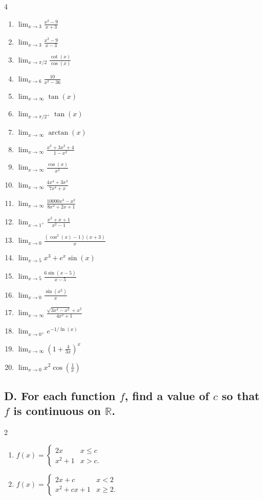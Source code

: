 \documentclass{article}
\begin{document}
\begin{multicols}{4}

\begin{enumerate}
\item $\displaystyle\lim_{x\to 3}\frac{x^2-9}{x+3}$
\item $\displaystyle\lim_{x\to 3}\frac{x^2-9}{x-3}$
\item $\displaystyle\lim_{x\to \pi/2}\frac{\cot(x)}{\cos(x)}$
\item $\displaystyle\lim_{x\to 6}\frac{10}{x^2-36}$
\item $\displaystyle\lim_{x\to \infty}\tan(x)$
\item $\displaystyle\lim_{x\to\pi/2^+} \tan(x)$
\item $\displaystyle\lim_{x\to \infty}\arctan(x)$
\item $\displaystyle\lim_{x\to \infty}\frac{x^3+3x^2+4}{1-x^2}$
\item $\displaystyle\lim_{x\to \infty}\frac{\cos(x)}{x^2}$
\item $\displaystyle\lim_{x\to \infty}\frac{4x^4+3x^3}{7x^4+x}$
\item $\displaystyle\lim_{x\to \infty}\frac{10000x^3-x^2}{8x^4+2x+1}$
\item $\displaystyle\lim_{x \rightarrow 1^+} \frac{x^2+x+1}{x^2-1}$
\item $\displaystyle\lim_{x\to 0}\frac{(\cos^2(x) - 1)(x+3)}{x}$
\item $\displaystyle\lim_{x\to 5}x^3+e^x\sin(x)$
\item $\displaystyle\lim_{x\to 5}\frac{6\sin(x-5)}{x-5}$
\item $\displaystyle\lim_{x\to 0}\frac{\sin(x^2)}{x}$
\item $\displaystyle\lim_{x\to \infty}\frac{\sqrt{3x^4-x^2}+x^2}{4x^2+1}$
\item $\displaystyle\lim_{x\to0^+}e^{-1/\ln\left(x\right)}$
\item $\displaystyle\lim_{x\to\infty}\left(1+\frac{4}{3x}\right)^x$
\item $\displaystyle\lim_{x\to0}x^{2}\cos\left(\frac{1}{x}\right)$
\end{enumerate}

\end{multicols}

\subsection*{D. For each function $f$, find a value of $c$ so that $f$ is continuous on $\mathbb{R}$.}
\begin{multicols}{2}
\begin{enumerate}
\item $f(x)=\begin{cases}2x & x \leq c \\ x^2+1 & x > c.\end{cases}$
\item $f(x)=\begin{cases}2x+c & x < 2 \\ x^2 + cx +1 & x \geq 2.\end{cases}$
\end{enumerate}
\end{multicols}
\end{document}
